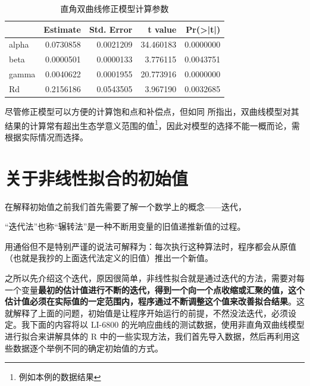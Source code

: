 \documentclass[
]{krantz}
\makeatletter
\newenvironment{Shaded}{\begin{snugshade}}{\end{snugshade}}
\newcommand{\CommentTok}[1]{\textcolor[rgb]{0.56,0.35,0.01}{\textit{#1}}}
\newcommand{\FunctionTok}[1]{\textcolor[rgb]{0.00,0.00,0.00}{#1}}
\newcommand{\NormalTok}[1]{#1}
\newcommand{\OtherTok}[1]{\textcolor[rgb]{0.56,0.35,0.01}{#1}}
\newcommand{\SpecialCharTok}[1]{\textcolor[rgb]{0.00,0.00,0.00}{#1}}
\newcommand{\StringTok}[1]{\textcolor[rgb]{0.31,0.60,0.02}{#1}}
\renewenvironment{quote}{\begin{VF}}{\end{VF}}
\newenvironment{kframe}{%
\medskip{}
\setlength{\fboxsep}{.8em}
 \def\at@end@of@kframe{}%
 \ifinner\ifhmode%
  \def\at@end@of@kframe{\end{minipage}}%
  \begin{minipage}{\columnwidth}%
 \fi\fi%
 \def\FrameCommand##1{\hskip\@totalleftmargin \hskip-\fboxsep
 \colorbox{shadecolor}{##1}\hskip-\fboxsep
     \hskip-\linewidth \hskip-\@totalleftmargin \hskip\columnwidth}%
 \MakeFramed {\advance\hsize-\width
   \@totalleftmargin\z@ \linewidth\hsize
   \@setminipage}}%
 {\par\unskip\endMakeFramed%
 \at@end@of@kframe}
\renewenvironment{Shaded}{\begin{kframe}}{\end{kframe}}
\makeatother
\begin{document}
\begin{table}

\caption{\label{tab:mrectable}直角双曲线修正模型计算参数}
\centering
\begin{tabular}[t]{lrrrr}
\toprule
  & Estimate & Std. Error & t value & Pr(>|t|)\\
\midrule
alpha & 0.0730858 & 0.0021209 & 34.460183 & 0.0000000\\
beta & 0.0000501 & 0.0000133 & 3.776115 & 0.0043751\\
gamma & 0.0040622 & 0.0001955 & 20.773916 & 0.0000000\\
Rd & 0.2156186 & 0.0543505 & 3.967190 & 0.0032685\\
\bottomrule
\end{tabular}
\end{table}

尽管修正模型可以方便的计算饱和点和补偿点，但如同 \citet{Lobo2013Fitting} 所指出，双曲线模型对其结果的计算常有超出生态学意义范围的值\footnote{例如本例的数据结果}，因此对模型的选择不能一概而论，需根据实际情况而选择。

\cleardoublepage

\hypertarget{start_con}{%
\chapter{关于非线性拟合的初始值}\label{start_con}}

在解释初始值之前我们首先需要了解一个数学上的概念------迭代，

\begin{quote}
``迭代法''也称``辗转法''是一种不断用变量的旧值递推新值的过程。
\end{quote}

用通俗但不是特别严谨的说法可解释为：每次执行这种算法时，程序都会从原值（也就是我抄的上面迭代法定义的旧值）推出一个新值。

之所以先介绍这个迭代，原因很简单，非线性拟合就是通过迭代的方法，需要对每一个变量\textbf{最初的估计值进行不断的迭代，得到一个向一个点收缩或汇聚的值，这个估计值必须在实际值的一定范围内，程序通过不断调整这个值来改善拟合结果}。这就解释了上面的问题，初始值是让程序开始运行的前提，不然没法迭代，必须设定。我下面的内容将以 LI-6800 的光响应曲线的测试数据，使用非直角双曲线模型进行拟合来讲解具体的 R 中的一些实现方法，我们首先导入数据，然后再利用这些数据逐个举例不同的确定初始值的方式。

\begin{Shaded}
\end{Shaded}
\end{document}
